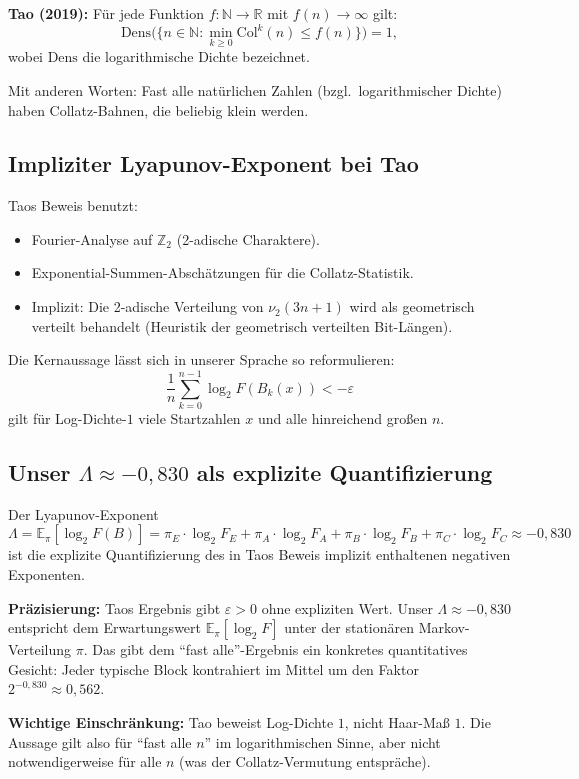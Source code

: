 \documentclass[12pt,a4paper]{article}
\newcommand{\vii}{\nu_2}
\newcommand{\N}{\mathbb{N}}
\newcommand{\R}{\mathbb{R}}
\newcommand{\Ztwo}{\mathbb{Z}_2}
\newcommand{\Epi}{\mathbb{E}_\pi}
\begin{document}
\begin{tcolorbox}[tao, title={Taos Hauptergebnis (2019)}]
\textbf{Tao (2019):} Für jede Funktion $f: \N \to \R$ mit $f(n) \to \infty$
gilt:
\[
  \text{Dens}\bigl(\{n \in \N : \min_{k\geq 0} \mathrm{Col}^k(n) \leq f(n)\}\bigr) = 1,
\]
wobei $\text{Dens}$ die logarithmische Dichte bezeichnet.

Mit anderen Worten: Fast alle natürlichen Zahlen (bzgl.\ logarithmischer
Dichte) haben Collatz-Bahnen, die beliebig klein werden.
\end{tcolorbox}

\subsection{Impliziter Lyapunov-Exponent bei Tao}

Taos Beweis benutzt:
\begin{itemize}
  \item Fourier-Analyse auf $\Ztwo$ (2-adische Charaktere).
  \item Exponential-Summen-Abschätzungen für die Collatz-Statistik.
  \item Implizit: Die 2-adische Verteilung von $\vii(3n+1)$ wird als
    geometrisch verteilt behandelt (Heuristik der geometrisch verteilten
    Bit-Längen).
\end{itemize}

Die Kernaussage lässt sich in unserer Sprache so reformulieren:
\[
  \frac{1}{n}\sum_{k=0}^{n-1}\log_2 F(B_k(x)) < -\varepsilon
\]
gilt für Log-Dichte-$1$ viele Startzahlen $x$ und alle hinreichend großen $n$.

\subsection{Unser $\Lambda \approx -0{,}830$ als explizite Quantifizierung}

\begin{tcolorbox}[ergebnis, title={Quantifizierung von Taos Ergebnis}]
Der Lyapunov-Exponent
\[
  \boxed{\Lambda = \Epi[\log_2 F(B)]
  = \pi_E \cdot \log_2 F_E
  + \pi_A \cdot \log_2 F_A
  + \pi_B \cdot \log_2 F_B
  + \pi_C \cdot \log_2 F_C
  \approx -0{,}830}
\]
ist die explizite Quantifizierung des in Taos Beweis implizit enthaltenen
negativen Exponenten.

\medskip
\textbf{Präzisierung:} Taos Ergebnis gibt $\varepsilon > 0$ ohne expliziten
Wert. Unser $\Lambda \approx -0{,}830$ entspricht dem Erwartungswert
$\mathbb{E}_\pi[\log_2 F]$ unter der stationären Markov-Verteilung $\pi$.
Das gibt dem ``fast alle''-Ergebnis ein konkretes quantitatives Gesicht:
Jeder typische Block kontrahiert im Mittel um den Faktor $2^{-0{,}830} \approx 0{,}562$.

\medskip
\textbf{Wichtige Einschränkung:} Tao beweist Log-Dichte $1$, nicht
Haar-Maß $1$. Die Aussage gilt also für ``fast alle $n$'' im
logarithmischen Sinne, aber nicht notwendigerweise für alle $n$
(was der Collatz-Vermutung entspräche).
\end{tcolorbox}
\end{document}
